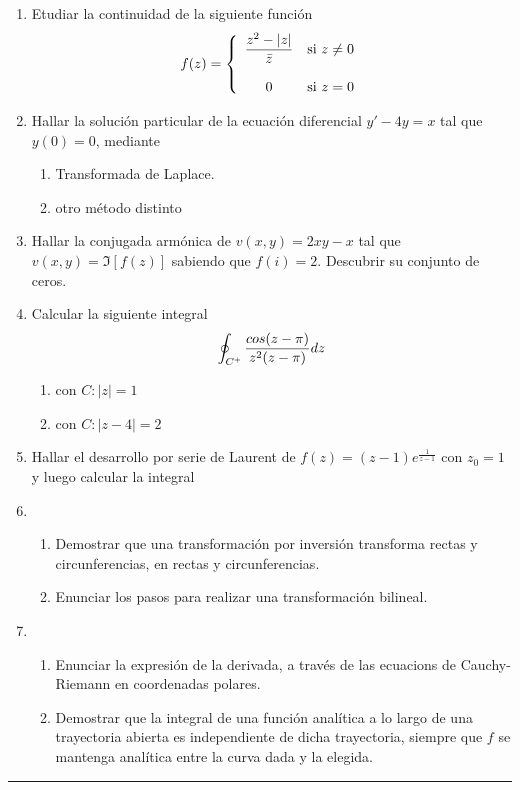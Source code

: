\documentclass[9pt,a4paper]{extarticle}
\newcommand{\plus}{\scalebox{0.6}{$+$}}
\begin{document}
\begin{enumerate}
    \item Etudiar la continuidad de la siguiente función
    $$
     f(z) = \left\{
	       \begin{array}{cc}
		 \dfrac{z^2-|z|}{\Bar{z}}      & \mathrm{si\ } z \neq 0 \\
		 &\\
		 0     & \mathrm{si\ } z = 0
	       \end{array}
	     \right.
$$
\item Hallar la solución particular de la ecuación diferencial $y' -4y=x$ tal que $y(0)=0$, mediante
\begin{enumerate}
    \item Transformada de Laplace.
    \item otro método distinto
\end{enumerate}

\item Hallar la conjugada armónica de $v(x,y)=2xy-x$ tal que $v(x,y)=\Im[f(z)]$ sabiendo que $f(i)=2$. Descubrir su conjunto de ceros.

\item Calcular la siguiente integral
$$
\oint_{C^{\plus}} \dfrac{cos(z-\pi)}{z^2(z-\pi)} dz
$$
\begin{enumerate}
    \item con $C: |z|=1$
    \item con $C: |z-4|=2$
\end{enumerate}
\item Hallar el desarrollo por serie de Laurent de $f(z)=(z-1)e^{\frac{1}{z-1}}$ con $z_0 =1$ y luego calcular la integral
\item \begin{enumerate}
    \item Demostrar que una transformación por inversión transforma rectas y circunferencias, en rectas y circunferencias.
    \item Enunciar los pasos para realizar una transformación bilineal.
\end{enumerate}
\item \begin{enumerate}
    \item Enunciar la expresión de la derivada, a través de las ecuacions de Cauchy-Riemann en coordenadas polares.
    \item Demostrar que la integral de una función analítica a lo largo de una trayectoria abierta es independiente de dicha trayectoria, siempre que $f$ se mantenga analítica entre la curva dada y la elegida.
\end{enumerate}
\end{enumerate}
\hrule
\end{document}

